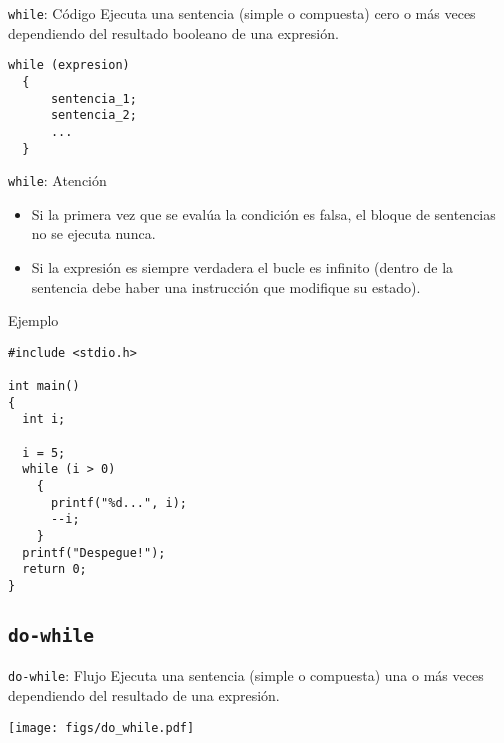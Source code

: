 \documentclass[xcolor={usenames,svgnames,dvipsnames}, aspectratio=169]{beamer}
\begin{document}
\begin{frame}[label={sec:org12e4ad2},fragile]{\texttt{while}: Código}
 Ejecuta una sentencia (simple o compuesta) \alert{cero o más veces} dependiendo del resultado booleano de una expresión.
\lstset{language=C,label= ,caption= ,captionpos=b,numbers=none}
\begin{lstlisting}
while (expresion)
  {
      sentencia_1;
      sentencia_2;
      ...
  }

\end{lstlisting}
\end{frame}

\begin{frame}[label={sec:org2f55d11},fragile]{\texttt{while}: Atención}
 \begin{block}{}
\begin{itemize}
\item Si la primera vez que se evalúa la condición es falsa, el bloque de sentencias \alert{no se ejecuta nunca}.

\item Si la expresión es siempre verdadera \alert{el bucle es infinito} (dentro de la sentencia debe haber una instrucción que modifique su estado).
\end{itemize}
\end{block}
\end{frame}

\begin{frame}[label={sec:orgb03cf7f},fragile]{Ejemplo}
 \lstset{language=C,label= ,caption= ,captionpos=b,numbers=none}
\begin{lstlisting}
#include <stdio.h>

int main()
{
  int i;

  i = 5;
  while (i > 0)
    {
      printf("%d...", i);
      --i;
    }
  printf("Despegue!");
  return 0;
}
\end{lstlisting}
\end{frame}

\subsection{\texttt{do-while}}
\label{sec:orgafed845}

\begin{frame}[label={sec:orgbd0dc36},fragile]{\texttt{do-while}: Flujo}
 Ejecuta una sentencia (simple o compuesta) \alert{una o más veces} dependiendo del resultado de una expresión.

\begin{center}
\texttt{[image: figs/do\_while.pdf]}
\end{center}
\end{frame}
\end{document}
